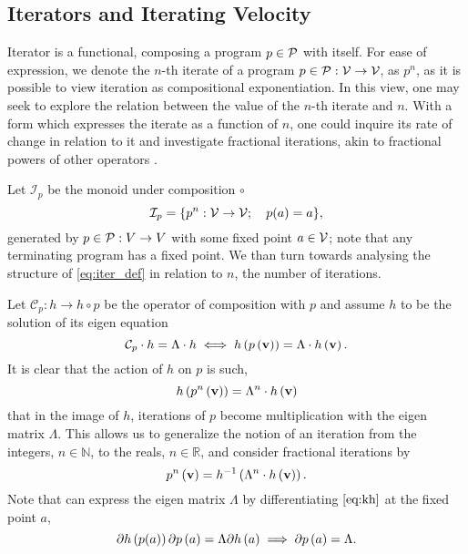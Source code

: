  \subsection{Iterators and Iterating Velocity}
 

  Iterator is a functional, composing a program $p\in\mathcal{P}$ with itself. For ease of expression, we denote the $n$-th iterate of a program $p\in\mathcal{P}:\mathcal{V}\to \mathcal{V}$, as $p^n$, as it is possible to view iteration as compositional exponentiation. In this view, one may seek to explore the relation between the value of the $n$-th iterate and $n$. With a form which expresses the iterate as a function of $n$, one could inquire its rate of change in relation to it and investigate fractional iterations, akin to fractional powers of other operators \cite{komatsu1966fractional}.
  
Let $\mathcal{I}_p$ be the monoid under composition $\circ$ 
  \begin{equation}\label{eq:iter_def}
  \mathcal{I}_p=\{p^n:\mathcal{V}\to \mathcal{V};\quad p(a)=a\},
  \end{equation}
  generated by $p\in\mathcal{P}:V\to V$ with some fixed point $a\in \mathcal{V}$; note that any terminating program has a fixed point. We than turn towards analysing the structure of \eqref{eq:iter_def} in relation to $n$, the number of iterations.

Let $\mathcal{C}_p:h\to h\circ p$ be the operator of composition with $p$ and assume $h$ to be the solution of its eigen equation
\begin{equation}\label{eq:kh}
 \mathcal{C}_p\cdot h=\Lambda \cdot h\iff h\left(p\left(\mathbf{v}\right)\right)=\Lambda\cdot h\left(\mathbf{v}\right).
  \end{equation}
It is clear that the action of $h$ on $p$ is such, 
  \begin{equation} 
  h\left(p^n\left(\mathbf{v}\right)\right)=\Lambda^n\cdot h\left(\mathbf{v}\right)
  \end{equation}
that in the image of $h$, iterations of $p$ become multiplication with the eigen matrix $\Lambda$. This allows us to generalize the notion of an iteration from the integers, $n\in\mathbb{N}$, to the reals, $n\in\mathbb{R}$, and consider fractional iterations by
\begin{equation}
  p^n\left(\mathbf{v}\right)=h^{-1}\left(\Lambda^n\cdot h\left(\mathbf{v}\right)\right).
\end{equation}
Note that can express the eigen matrix $\Lambda$ by differentiating $\eqref{eq:kh}$ at the fixed point $a$,
$$\partial h\left(p(a)\right)\partial p\left(a\right)=\Lambda\partial h\left(a\right)\implies\partial p\left(a\right)=\Lambda.$$

